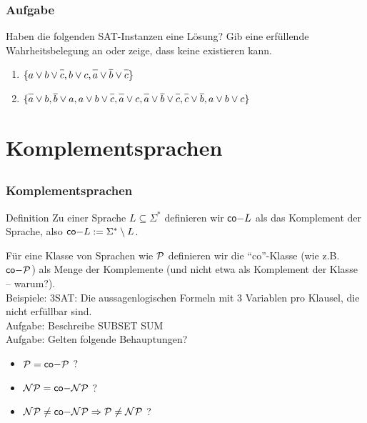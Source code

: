 \begin{frame}
	\frametitle{Aufgabe}
	
	Haben die folgenden SAT-Instanzen eine Lösung? Gib eine erfüllende Wahrheitsbelegung an oder zeige, dass keine existieren kann.
\begin{enumerate}
 \item $\{a \vee b \vee \neglit{c}, b \vee c, \neglit{a} \vee \neglit{b} \vee \neglit{c}\}$
 \item $\{\neglit{a} \vee b, \neglit{b} \vee  a, a \vee b \vee \neglit{c}, \neglit{a} \vee c, \neglit{a} \vee \neglit{b} \vee \neglit{c}, \neglit{c} \vee \neglit{b}, a \vee b \vee c\}$
\end{enumerate}
\end{frame}

\section{Komplementsprachen}
\subsection{}

\begin{frame}
\frametitle{Komplementsprachen}
\begin{block}{Definition}
Zu einer Sprache $L \subseteq \Sigma^*$ definieren wir $\mathsf{co-} L$ als das Komplement der Sprache, also
$\mathsf{co-} L := \Sigma^*\setminus L$.
\end{block}
Für eine Klasse von Sprachen wie $\mathcal{P}$ definieren wir die "`co"'-Klasse (wie z.B. $\mathsf{co-}\mathcal{P}$) als Menge der Komplemente (und nicht etwa als Komplement der Klasse -- warum?).\\[8pt]
\pause
Beispiele: \co 3SAT: Die aussagenlogischen Formeln mit 3 Variablen pro Klausel, die nicht erfüllbar sind.\\[8pt]

\pause
Aufgabe: Beschreibe \co SUBSET SUM\\[8pt]

\pause
Aufgabe: Gelten folgende Behauptungen?
\begin{itemize}
    \item $\mathcal{P} = \mathsf{co-}\mathcal{P}$ ?
    \item $\mathcal{NP} = \mathsf{co-}\mathcal{NP}$ ?
    \invincible \pause
    \item $\mathcal{NP} \neq \mathsf{co-}\mathcal{NP} \Rightarrow \mathcal{P} \neq \mathcal{NP}$ ?
    \vincible
\end{itemize}
\end{frame}

